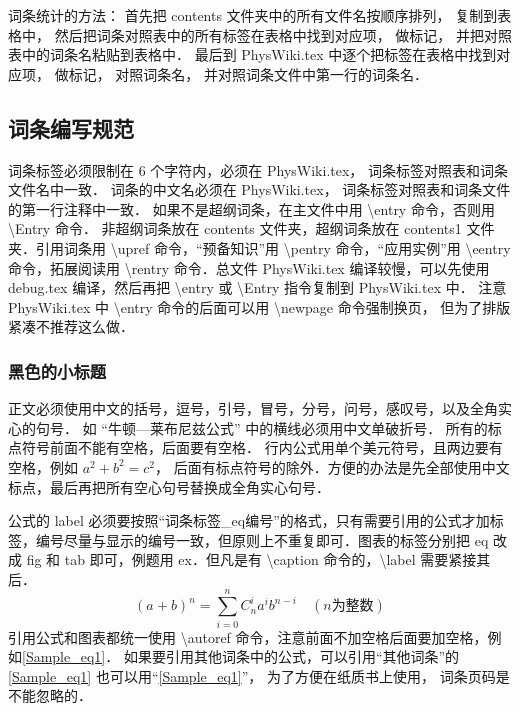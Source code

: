 词条统计的方法： 首先把 contents 文件夹中的所有文件名按顺序排列， 复制到表格中， 然后把词条对照表中的所有标签在表格中找到对应项， 做标记， 并把对照表中的词条名粘贴到表格中． 最后到 PhysWiki.tex 中逐个把标签在表格中找到对应项， 做标记， 对照词条名， 并对照词条文件中第一行的词条名．

\subsection{词条编写规范}

词条标签必须限制在 6 个字符内，必须在 PhysWiki.tex， 词条标签对照表和词条文件名中一致． 词条的中文名必须在 PhysWiki.tex， 词条标签对照表和词条文件的第一行注释中一致． 如果不是超纲词条，在主文件中用 \textbackslash entry 命令，否则用 \textbackslash Entry 命令． 非超纲词条放在 contents 文件夹，超纲词条放在 contents1 文件夹．引用词条用 \textbackslash upref 命令，“预备知识”用 \textbackslash pentry 命令，“应用实例”用 \textbackslash eentry 命令，拓展阅读用 \textbackslash rentry 命令．总文件 PhysWiki.tex 编译较慢，可以先使用 debug.tex 编译，然后再把 \textbackslash entry 或 \textbackslash Entry 指令复制到 PhysWiki.tex 中． 注意 PhysWiki.tex 中 \textbackslash entry 命令的后面可以用 \textbackslash newpage 命令强制换页， 但为了排版紧凑不推荐这么做．

\subsubsection{黑色的小标题}

正文必须使用中文的括号，逗号，引号，冒号，分号，问号，感叹号，以及全角实心的句号． 如 “牛顿—莱布尼兹公式” 中的横线必须用中文单破折号． 所有的标点符号前面不能有空格，后面要有空格． 行内公式用单个美元符号，且两边要有空格，例如 $a^2+b^2=c^2$， 后面有标点符号的除外．方便的办法是先全部使用中文标点，最后再把所有空心句号替换成全角实心句号．

公式的 label 必须要按照“词条标签\_eq编号”的格式，只有需要引用的公式才加标签，编号尽量与显示的编号一致，但原则上不重复即可．图表的标签分别把 eq 改成 fig 和 tab 即可，例题用 ex．但凡是有 \textbackslash caption 命令的，\textbackslash label 需要紧接其后．
\begin{equation}\label{Sample_eq1}
(a+b)^n = \sum_{i=0}^n C_n^i a^i b^{n-i} \quad (n\text{为整数})
\end{equation}
引用公式和图表都统一使用 \textbackslash autoref 命令，注意前面不加空格后面要加空格，例如\autoref{Sample_eq1}． 如果要引用其他词条中的公式，可以引用“其他词条”的\autoref{Sample_eq1} 也可以用“\autoref{Sample_eq1}”， 为了方便在纸质书上使用， 词条页码是不能忽略的．

